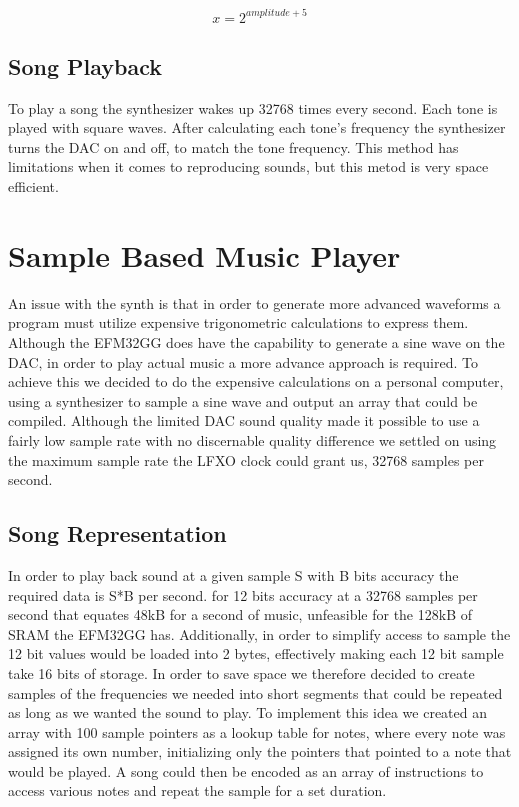\begin{equation}
  x = 2^{amplitude + 5}
  \label{eq:amplitudCalculation}
\end{equation}

\subsection{Song Playback}
To play a song the synthesizer wakes up 32768 times every second. Each tone is played with square waves. After calculating each tone's frequency the synthesizer turns the DAC on and off, to match the tone frequency. This method has limitations when it comes to reproducing sounds, but this metod is very space efficient.

\section{Sample Based Music Player}\label{sec:sample-based-music-player}
An issue with the synth is that in order to generate more advanced waveforms a program must utilize expensive trigonometric calculations to express them. Although the EFM32GG does have the capability to generate a sine wave on the DAC, in order to play actual music a more advance approach is required. To achieve this we decided to do the expensive calculations on a personal computer, using a synthesizer to sample a sine wave and output an array that could be compiled. Although the limited DAC sound quality made it possible to use a fairly low sample rate with no discernable quality difference we settled on using the maximum sample rate the LFXO clock could grant us, 32768 samples per second. 

\subsection{Song Representation}
In order to play back sound at a given sample S with B bits accuracy the required data is S*B per second. for 12 bits accuracy at a 32768 samples per second that equates 48kB for a second of music, unfeasible for the 128kB of SRAM the EFM32GG has. Additionally, in order to simplify access to sample the 12 bit values would be loaded into 2 bytes, effectively making each 12 bit sample take 16 bits of storage. In order to save space we therefore decided to create samples of the frequencies we needed into short segments that could be repeated as long as we wanted the sound to play. To implement this idea we created an array with 100 sample pointers as a lookup table for notes, where every note was assigned its own number, initializing only the pointers that pointed to a note that would be played. A song could then be encoded as an array of instructions to access various notes and repeat the sample for a set duration.


